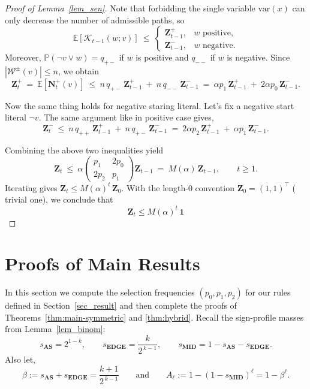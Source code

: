 \documentclass[11pt,reqno]{amsart}
\numberwithin{equation}{section}
\renewcommand{\vec}[1]{\boldsymbol{#1}}
\newcommand\cK{\mathcal K}
\newcommand\cW{\mathcal W}
\newcommand\vN{\vec N}
\newcommand\vZ{\vec Z}
\newcommand\Erw{\mathbb{E}}
\newcommand\ex{\Erw}
\newcommand\pr{\mathbb{P}}
\renewcommand\Pr{\pr}
\newcommand\Lem{Lemma}
\newcommand\Sec{Section}
\def\pr{{\mathbb P}}
\begin{document}
\begin{proof}[Proof of \Lem~\ref{lem_sen}]
    	Note that forbidding the single variable $\mathrm{var}(x)$ can only decrease the number of admissible paths,
    	so
    	\[
    	\ex[\cK_{t-1}(w;v)]\ \le\
    	\begin{cases}
    		\vZ_{t-1}^+,& w\text{ positive},\\
    		\vZ_{t-1}^-,& w\text{ negative}.
    	\end{cases}
    	\]
    	Moreover, $\Pr(\neg v\vee w)=q_{+-}$ if $w$ is positive and $q_{--}$ if $w$ is negative.
    	Since $|\cW^\pm(v)|\le n$, we obtain
    	\[
    	\vZ_t^+\ =\ \ex[\vN_t^+(v)]
    	\ \le\ n\,q_{+-}\,\vZ_{t-1}^+\ +\ n\,q_{--}\,\vZ_{t-1}^-
    	\ =\ \alpha p_1\,\vZ_{t-1}^+\ +\ 2\alpha p_0\,\vZ_{t-1}^-.
    	\]
    	
    	
    	Now the same thing holds for negative staring literal.
    	Let's fix a negative start literal $\neg v$.
    	The same argument like in positive case gives,
    	\[
    	\vZ_t^-\ \le\ n\,q_{++}\,\vZ_{t-1}^+\ +\ n\,q_{+-}\,\vZ_{t-1}^-
    	\ =\ 2\alpha p_2\,\vZ_{t-1}^+\ +\ \alpha p_1\,\vZ_{t-1}^-.
    	\]
    	
    	Combining the above two inequalities yield
    	\[
    	\vZ_t\ \le\ \alpha\begin{pmatrix} p_1 & 2p_0\\[2pt] 2p_2 & p_1\end{pmatrix}\vZ_{t-1}
    	\ =\ M(\alpha)\,\vZ_{t-1},\qquad t\ge 1.
    	\]
    	Iterating gives $\vZ_t\le M(\alpha)^t\,\vZ_0$.
    	With the length-$0$ convention $\vZ_0=(1,1)^\top$ ( trivial one), we conclude that
    	\[
    	\vZ_t\le M(\alpha)^t\,\mathbf 1
    	\]
    \end{proof}
	\section{Proofs of Main Results}\label{sec:proof-main}
	In this section we compute the selection frequencies \((p_0,p_1,p_2)\) for our rules defined in \Sec~\ref{sec_result} and then complete the proofs of Theorems~\ref{thm:main-symmetric} and \ref{thm:hybrid}.
	Recall the sign-profile masses from Lemma~\ref{lem_binom}:
	\[
	s_{\mathbf{AS}}=2^{1-k},\qquad s_{\mathbf{EDGE}}=\frac{k}{2^{\,k-1}},\qquad
	s_{\mathbf{MID}}=1-s_{\mathbf{AS}}-s_{\mathbf{EDGE}}.
	\]
	Also let,
	\[
	\beta:=s_{\mathbf{AS}}+s_{\mathbf{EDGE}}=\frac{k+1}{2^{\,k-1}}\qquad\text{and}\qquad
	A_\ell:=1-(1-s_{\mathbf{MID}})^\ell=1-\beta^\ell.
	\]
	
\end{document}
